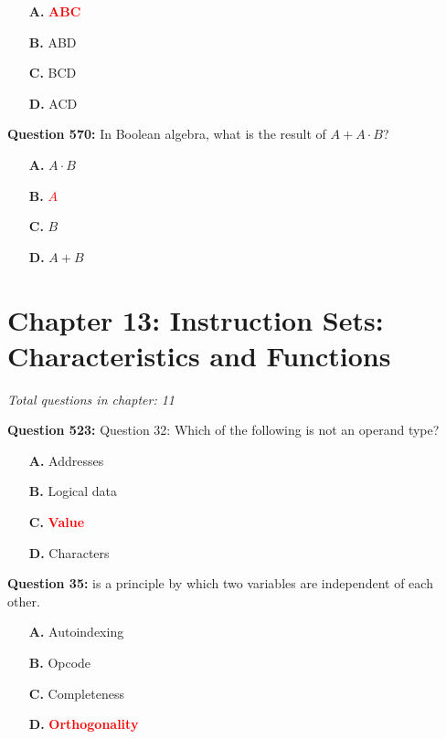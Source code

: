 \documentclass[12pt,a4paper]{article}
\begin{document}
\begin{itemize}
    \item[\textbf{A.}] \textcolor{red}{\textbf{ABC}}
    \item[\textbf{B.}] ABD
    \item[\textbf{C.}] BCD
    \item[\textbf{D.}] ACD
\end{itemize}

\textbf{Question 570:} In Boolean algebra, what is the result of \(A + A \cdot B\)?

\begin{itemize}
    \item[\textbf{A.}] \(A \cdot B\)
    \item[\textbf{B.}] \textcolor{red}{\textbf{\(A\)}}
    \item[\textbf{C.}] \(B\)
    \item[\textbf{D.}] \(A + B\)
\end{itemize}

\section{Chapter 13: Instruction Sets: Characteristics and Functions}
\textit{Total questions in chapter: 11}

\textbf{Question 523:} Question 32: Which of the following is not an operand type?

\begin{itemize}
    \item[\textbf{A.}] Addresses
    \item[\textbf{B.}] Logical data
    \item[\textbf{C.}] \textcolor{red}{\textbf{Value}}
    \item[\textbf{D.}] Characters
\end{itemize}

\vspace{0.5cm}

\vspace{0.5cm}

\textbf{Question 35:} \underline{\hspace{1.5cm}} is a principle by which two variables are independent of each other.

\begin{itemize}
    \item[\textbf{A.}] Autoindexing
    \item[\textbf{B.}] Opcode
    \item[\textbf{C.}] Completeness
    \item[\textbf{D.}] \textcolor{red}{\textbf{Orthogonality}}
\end{itemize}
\end{document}
